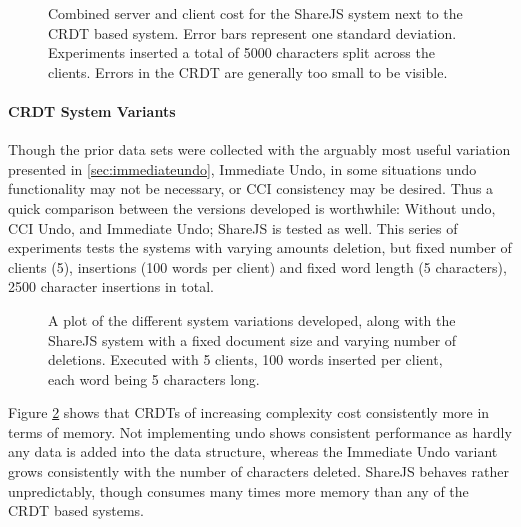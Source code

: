 \documentclass[12pt,a4paper,twoside,openright]{report}
\begin{document}
				\begin{figure}[htb]
					\centering
					
					\caption[Memory Consumption versus Replication] {Combined server and client cost for the ShareJS system next to the CRDT based system. Error bars represent one standard deviation. Experiments inserted a total of 5000 characters split across the clients. Errors in the CRDT are generally too small to be visible.}
					\label{fig:memvsreplication}
				\end{figure}
				
			\paragraph{CRDT System Variants}
				Though the prior data sets were collected with the arguably most useful variation presented in \cref{sec:immediateundo}, Immediate Undo, in some situations undo functionality may not be necessary, or CCI consistency may be desired. Thus a quick comparison between the versions developed is worthwhile: Without undo, CCI Undo, and Immediate Undo; ShareJS is tested as well. This series of experiments tests the systems with varying amounts deletion, but fixed number of clients (5), insertions (100 words per client) and fixed word length (5 characters), 2500 character insertions in total.
				
				\begin{figure}[htb]
					\centering
					
					\caption[Behavior of System Variants - Memory] {A plot of the different system variations developed, along with the ShareJS system with a fixed document size and varying number of deletions. Executed with 5 clients, 100 words inserted per client, each word being 5 characters long.}
					\label{fig:variantsmemory}
				\end{figure}
				
				Figure \ref{fig:variantsmemory} shows that CRDTs of increasing complexity cost consistently more in terms of memory. Not implementing undo shows consistent performance as hardly any data is added into the data structure, whereas the Immediate Undo variant grows consistently with the number of characters deleted. ShareJS behaves rather unpredictably, though consumes many times more memory than any of the CRDT based systems.
				
\end{document}
